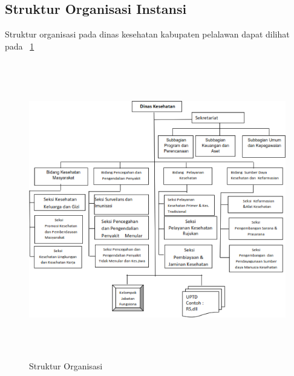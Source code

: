 \subsection{Struktur Organisasi Instansi}
Struktur organisasi pada dinas kesehatan kabupaten pelalawan dapat dilihat pada \pic~\ref{StrukturOrganisasi}

\begin{figure}
	\centering
	\includegraphics [height=13cm, width=13cm]{konten/gambar/StrukturOrganisasi.png}
	\caption{Struktur Organisasi}
	\label{StrukturOrganisasi}
\end{figure}

